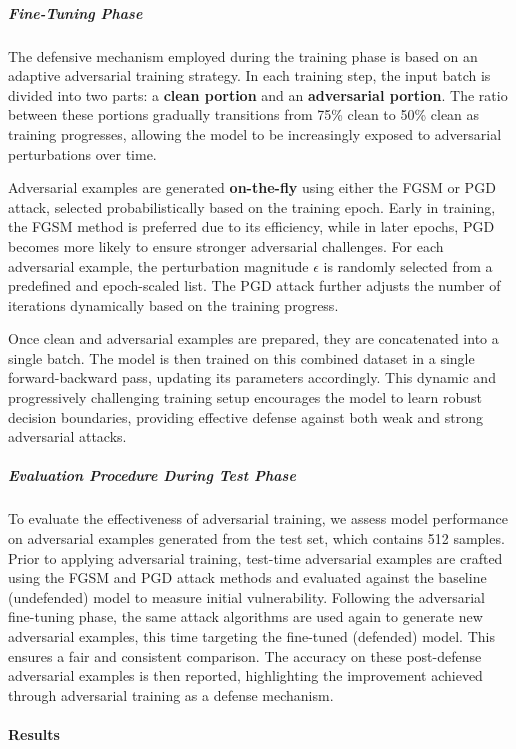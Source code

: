 \documentclass[../main.tex]{subfiles}
\begin{document}
\subparagraph*{Fine-Tuning Phase}

The defensive mechanism employed during the training phase is based on an adaptive adversarial training strategy. In each training step, the input batch is divided into two parts: a \textbf{clean portion} and an \textbf{adversarial portion}. The ratio between these portions gradually transitions from 75\% clean to 50\% clean as training progresses, allowing the model to be increasingly exposed to adversarial perturbations over time.

Adversarial examples are generated \textbf{on-the-fly} using either the FGSM or PGD attack, selected probabilistically based on the training epoch. Early in training, the FGSM method is preferred due to its efficiency, while in later epochs, PGD becomes more likely to ensure stronger adversarial challenges. For each adversarial example, the perturbation magnitude $\epsilon$ is randomly selected from a predefined and epoch-scaled list. The PGD attack further adjusts the number of iterations dynamically based on the training progress.

Once clean and adversarial examples are prepared, they are concatenated into a single batch. The model is then trained on this combined dataset in a single forward-backward pass, updating its parameters accordingly. This dynamic and progressively challenging training setup encourages the model to learn robust decision boundaries, providing effective defense against both weak and strong adversarial attacks.
\subparagraph*{Evaluation Procedure During Test Phase}
To evaluate the effectiveness of adversarial training, we assess model performance on adversarial examples generated from the test set, which contains 512 samples. Prior to applying adversarial training, test-time adversarial examples are crafted using the FGSM and PGD attack methods and evaluated against the baseline (undefended) model to measure initial vulnerability. Following the adversarial fine-tuning phase, the same attack algorithms are used again to generate new adversarial examples, this time targeting the fine-tuned (defended) model. This ensures a fair and consistent comparison. The accuracy on these post-defense adversarial examples is then reported, highlighting the improvement achieved through adversarial training as a defense mechanism.


\clearpage
\paragraph{Results}\mbox{}\\[1ex]
\end{document}
